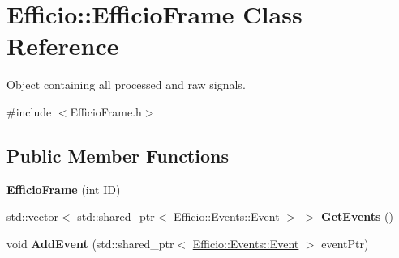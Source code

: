 \hypertarget{class_efficio_1_1_efficio_frame}{}\section{Efficio\+:\+:Efficio\+Frame Class Reference}
\label{class_efficio_1_1_efficio_frame}


Object containing all processed and raw signals.  




{\ttfamily \#include $<$Efficio\+Frame.\+h$>$}

\subsection*{Public Member Functions}
\begin{DoxyCompactItemize}
\item 
{\bfseries Efficio\+Frame} (int ID)\hypertarget{class_efficio_1_1_efficio_frame_a9b49dc8882fa2c58ebcd8710bb14de91}{}\label{class_efficio_1_1_efficio_frame_a9b49dc8882fa2c58ebcd8710bb14de91}

\item 
std\+::vector$<$ std\+::shared\+\_\+ptr$<$ \hyperlink{class_efficio_1_1_events_1_1_event}{Efficio\+::\+Events\+::\+Event} $>$ $>$ {\bfseries Get\+Events} ()\hypertarget{class_efficio_1_1_efficio_frame_a219e88c37091c04515e7022c65300654}{}\label{class_efficio_1_1_efficio_frame_a219e88c37091c04515e7022c65300654}

\item 
void {\bfseries Add\+Event} (std\+::shared\+\_\+ptr$<$ \hyperlink{class_efficio_1_1_events_1_1_event}{Efficio\+::\+Events\+::\+Event} $>$ event\+Ptr)\hypertarget{class_efficio_1_1_efficio_frame_a2a50c673ea34e5d85707a55099ebae63}{}\label{class_efficio_1_1_efficio_frame_a2a50c673ea34e5d85707a55099ebae63}

\end{DoxyCompactItemize}

